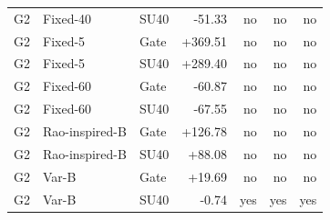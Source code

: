\begin{longtable}{lllrrrr}
G2 & Fixed-40 & SU40 & -51.33 & no & no & no \\
G2 & Fixed-5 & Gate & +369.51 & no & no & no \\
G2 & Fixed-5 & SU40 & +289.40 & no & no & no \\
G2 & Fixed-60 & Gate & -60.87 & no & no & no \\
G2 & Fixed-60 & SU40 & -67.55 & no & no & no \\
G2 & Rao-inspired-B & Gate & +126.78 & no & no & no \\
G2 & Rao-inspired-B & SU40 & +88.08 & no & no & no \\
G2 & Var-B & Gate & +19.69 & no & no & no \\
G2 & Var-B & SU40 & -0.74 & yes & yes & yes \\
\bottomrule\end{longtable}\endgroup
